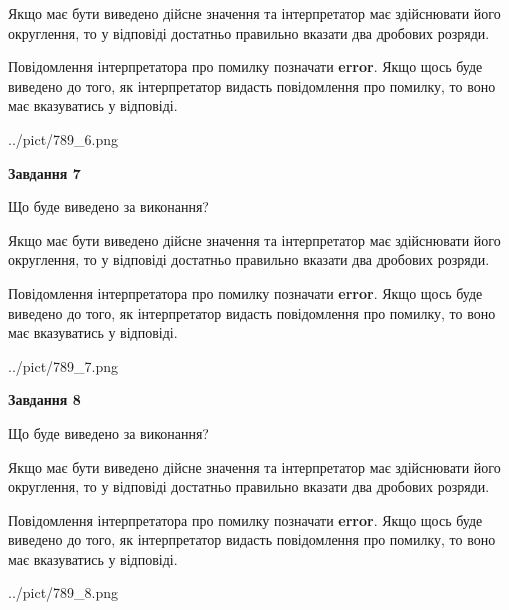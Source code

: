\documentclass[12pt, ukrainian]{article}
\begin{document}
{\begin {Large}
Якщо має бути виведено дійсне значення та інтерпретатор має здійснювати його округлення, 
то у відповіді достатньо правильно вказати два дробових розряди.

Повідомлення інтерпретатора про помилку позначати \textbf{error}.
Якщо щось буде виведено до того, як інтерпретатор видасть повідомлення про помилку, 
то воно має вказуватись у відповіді. \par

\begin{center}
	{../pict/789_6.png}
\end{center}
\newpage

{\begin {center}\textbf{Завдання 7}\end {center}}\par
Що буде виведено за виконання? \par

Якщо має бути виведено дійсне значення та інтерпретатор має здійснювати його округлення, 
то у відповіді достатньо правильно вказати два дробових розряди.

Повідомлення інтерпретатора про помилку позначати \textbf{error}.
Якщо щось буде виведено до того, як інтерпретатор видасть повідомлення про помилку, 
то воно має вказуватись у відповіді. \par

\begin{center}
	{../pict/789_7.png}
\end{center}
\newpage

{\begin {center}\textbf{Завдання 8}\end {center}}\par
Що буде виведено за виконання? \par

Якщо має бути виведено дійсне значення та інтерпретатор має здійснювати його округлення, 
то у відповіді достатньо правильно вказати два дробових розряди.

Повідомлення інтерпретатора про помилку позначати \textbf{error}.
Якщо щось буде виведено до того, як інтерпретатор видасть повідомлення про помилку, 
то воно має вказуватись у відповіді. \par

\begin{center}
	{../pict/789_8.png}
\end{center}
\newpage


\end{Large}}
\end{document}
